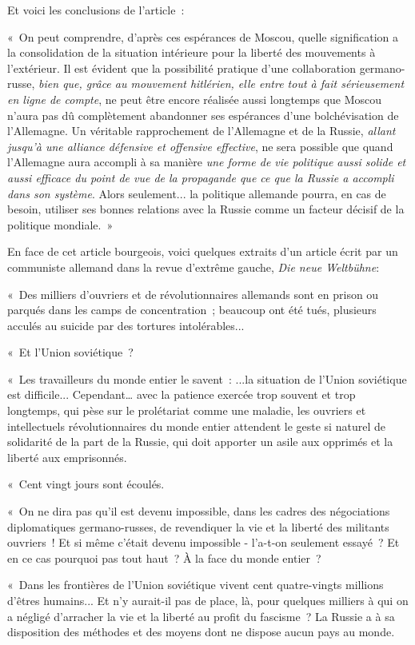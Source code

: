 \documentclass[french,twoside]{book} %
\begin{document}
Et voici les conclusions de l'article :\par
« On peut comprendre, d'après ces espérances de Moscou, quelle signifi­cation a la consolidation de la situation intérieure pour la liberté des mouvements à l'extérieur. Il est évident que la possibilité pratique d'une collaboration germano-russe, {\itshape bien que, grâce au mouvement hitlérien, elle entre tout à fait sérieusement en ligne de compte}, ne peut être encore réalisée aussi longtemps que Moscou n'aura pas dû complètement abandonner ses espérances d'une bolchévisation de l'Allemagne. Un véritable rapprochement de l'Allemagne et de la Russie, {\itshape allant jusqu'à une alliance défensive et offen­sive effective}, ne sera possible que quand l'Allemagne aura accompli à sa manière {\itshape une forme de vie politique aussi solide et aussi efficace du point de vue de la propagande que ce que la Russie a accompli dans son système}. Alors seulement... la politique allemande pourra, en cas de besoin, utiliser ses bonnes relations avec la Russie comme un facteur décisif de la politique mon­diale. »\par
En face de cet article bourgeois, voici quelques extraits d'un article écrit par un communiste allemand dans la revue d'extrême gauche, {\itshape Die neue Weltbühne}:\par
« Des milliers d'ouvriers et de révolutionnaires allemands sont en prison ou parqués dans les camps de concentration ; beaucoup ont été tués, plusieurs acculés au suicide par des tortures intolérables...\par
« Et l'Union soviétique ?\par
« Les travailleurs du monde entier le savent : ...la situation de l'Union soviétique est difficile... Cependant… avec la patience exercée trop souvent et trop longtemps, qui pèse sur le prolétariat comme une maladie, les ouvriers et intellectuels révolutionnaires du monde entier attendent le geste si naturel de solidarité de la part de la Russie, qui doit apporter un asile aux opprimés et la liberté aux emprisonnés.\par
« Cent vingt jours sont écoulés.\par
« On ne dira pas qu'il est devenu impossible, dans les cadres des négocia­tions diplomatiques germano-russes, de revendiquer la vie et la liberté des militants ouvriers ! Et si même c'était devenu impossible - l'a-t-on seulement essayé ? Et en ce cas pourquoi pas tout haut ? À la face du monde entier ?\par
« Dans les frontières de l'Union soviétique vivent cent quatre-vingts millions d'êtres humains... Et n'y aurait-il pas de place, là, pour quelques milliers à qui on a négligé d'arracher la vie et la liberté au profit du fascisme ? La Russie a à sa disposition des méthodes et des moyens dont ne dispose aucun pays au monde.\par
\end{document}
